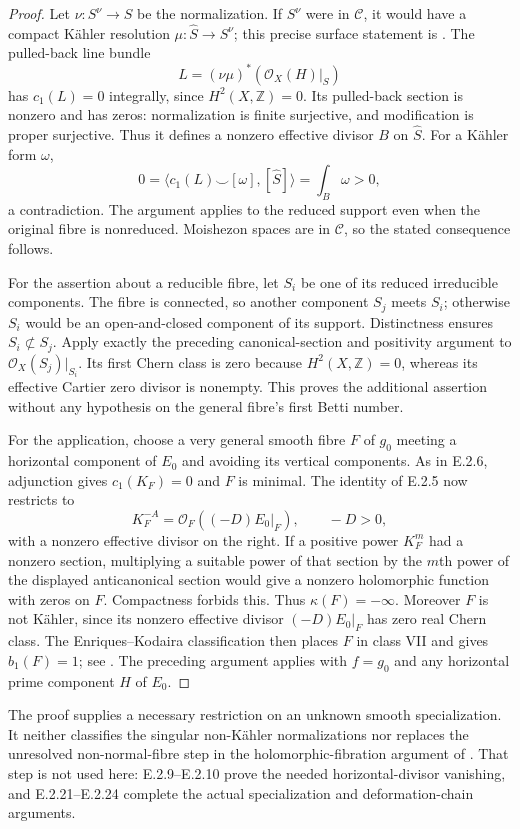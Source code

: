 \begin{proof}
Let $\nu:S^\nu\to S$ be the normalization.  If $S^\nu$ were
in $\mathcal C$, it would have a compact K\"ahler resolution
$\mu:\widehat S\to S^\nu$; this precise surface statement is
\citet[Lemma~3.3 and Corollary~3.4]{Fujino2021E}.
The pulled-back line bundle
\[
 L=(\nu\mu)^*(\mathcal O_X(H)|_S)
\]
has $c_1(L)=0$ integrally, since $H^2(X,\mathbb Z)=0$.
Its pulled-back section is nonzero and has zeros: normalization
is finite surjective, and modification is proper surjective.
Thus it defines a nonzero effective divisor $B$ on
$\widehat S$.  For a K\"ahler form $\omega$,
\[
 0=\langle c_1(L)\smile[\omega],[\widehat S]\rangle
   =\int_B\omega>0,
\]
a contradiction.  The argument applies to the reduced support
even when the original fibre is nonreduced.  Moishezon spaces
are in $\mathcal C$, so the stated consequence follows.

For the assertion about a reducible fibre, let $S_i$ be one
of its reduced irreducible components.  The fibre is connected,
so another component $S_j$ meets $S_i$; otherwise $S_i$ would
be an open-and-closed component of its support.  Distinctness
ensures $S_i\not\subset S_j$.  Apply exactly the preceding
canonical-section and positivity argument to
$\mathcal O_X(S_j)|_{S_i}$.  Its first Chern class is zero
because $H^2(X,\mathbb Z)=0$, whereas its effective Cartier
zero divisor is nonempty.  This proves the additional assertion
without any hypothesis on the general fibre's first Betti number.

For the application, choose a very general smooth fibre $F$
of $g_0$ meeting a horizontal component of $E_0$ and avoiding
its vertical components.  As in E.2.6, adjunction gives
$c_1(K_F)=0$ and $F$ is minimal.  The identity of E.2.5 now
restricts to
\[
 K_F^{-A}=\mathcal O_F((-D)E_0|_F),
 \qquad -D>0,
\]
with a nonzero effective divisor on the right.  If a positive
power $K_F^m$ had a nonzero section, multiplying a suitable
power of that section by the $m$th power of the displayed
anticanonical section would give a nonzero holomorphic
function with zeros on $F$.  Compactness forbids this.
Thus $\kappa(F)=-\infty$.  Moreover $F$ is not K\"ahler,
since its nonzero effective divisor $(-D)E_0|_F$ has zero
real Chern class.  The Enriques--Kodaira classification then
places $F$ in class VII and gives $b_1(F)=1$; see
\citet[Chapter~VI, Theorem~1.1 and Table~10, pp.~243--244]
{BHPV2004E}.  The preceding argument applies with $f=g_0$
and any horizontal prime component $H$ of $E_0$.
\end{proof}

The proof supplies a necessary restriction on an unknown
smooth specialization.  It neither classifies the singular
non-K\"ahler normalizations nor replaces the unresolved
non-normal-fibre step in the holomorphic-fibration argument
of \citet[\S7]{CDP2020D}.  That step is not used here:
E.2.9--E.2.10 prove the needed horizontal-divisor vanishing,
and E.2.21--E.2.24 complete the actual specialization and
deformation-chain arguments.
